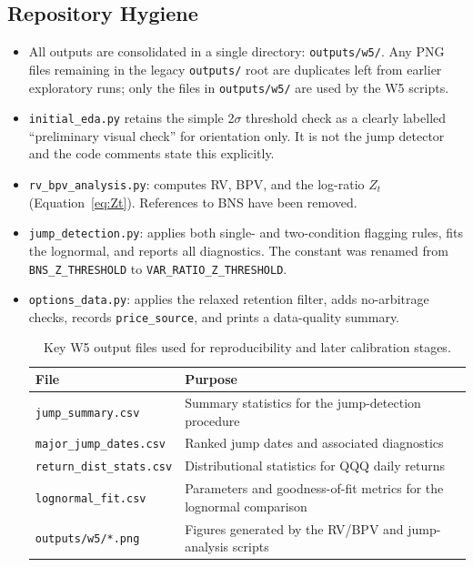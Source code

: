 \documentclass[12pt]{article}
\begin{document}
\subsection*{Repository Hygiene}

\begin{itemize}
  \item All outputs are consolidated in a single directory: \texttt{outputs/w5/}. Any PNG files remaining in the legacy \texttt{outputs/} root are duplicates left from earlier exploratory runs; only the files in \texttt{outputs/w5/} are used by the W5 scripts.
  \item \texttt{initial\_eda.py} retains the simple 2$\sigma$ threshold check as a clearly labelled ``preliminary visual check'' for orientation only. It is not the jump detector and the code comments state this explicitly.
  \item \texttt{rv\_bpv\_analysis.py}: computes RV, BPV, and the log-ratio $Z_t$ (Equation~\eqref{eq:Zt}). References to BNS have been removed.
  \item \texttt{jump\_detection.py}: applies both single- and two-condition flagging rules, fits the lognormal, and reports all diagnostics. The constant was renamed from \texttt{BNS\_Z\_THRESHOLD} to \texttt{VAR\_RATIO\_Z\_THRESHOLD}.
  \item \texttt{options\_data.py}: applies the relaxed retention filter, adds no-arbitrage checks, records \texttt{price\_source}, and prints a data-quality summary.

  \begin{table}[htbp]
    \centering
    \small
    \caption{Key W5 output files used for reproducibility and later calibration stages.}
    \label{tab:w5-output-files}
    \begin{tabular}{p{4.3cm}p{7.2cm}}
        \toprule
        File & Purpose \\
        \midrule
        \texttt{jump\_summary.csv} & Summary statistics for the jump-detection procedure \\
        \texttt{major\_jump\_dates.csv} & Ranked jump dates and associated diagnostics \\
        \texttt{return\_dist\_stats.csv} & Distributional statistics for QQQ daily returns \\
        \texttt{lognormal\_fit.csv} & Parameters and goodness-of-fit metrics for the lognormal comparison \\
        \texttt{outputs/w5/*.png} & Figures generated by the RV/BPV and jump-analysis scripts \\
        \bottomrule
    \end{tabular}
\end{table}

  
\end{itemize}
\end{document}
